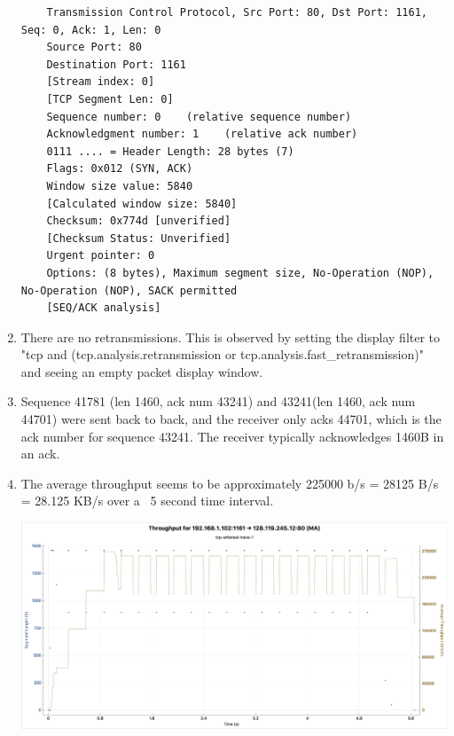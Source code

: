 \documentclass[letter,10pt]{article}
\begin{document}
\begin{enumerate}
	\begin{verbatim}
	Transmission Control Protocol, Src Port: 80, Dst Port: 1161, Seq: 0, Ack: 1, Len: 0
	Source Port: 80
	Destination Port: 1161
	[Stream index: 0]
	[TCP Segment Len: 0]
	Sequence number: 0    (relative sequence number)
	Acknowledgment number: 1    (relative ack number)
	0111 .... = Header Length: 28 bytes (7)
	Flags: 0x012 (SYN, ACK)
	Window size value: 5840
	[Calculated window size: 5840]
	Checksum: 0x774d [unverified]
	[Checksum Status: Unverified]
	Urgent pointer: 0
	Options: (8 bytes), Maximum segment size, No-Operation (NOP), No-Operation (NOP), SACK permitted
	[SEQ/ACK analysis]
	\end{verbatim}
	
	\item There are no retransmissions. This is observed by setting the display filter to "tcp and (tcp.analysis.retransmission or tcp.analysis.fast\_retransmission)" and seeing an empty packet display window.
	
	\item Sequence 41781 (len 1460, ack num 43241) and 43241(len 1460, ack num 44701) were sent back to back, and the receiver only acks 44701, which is the ack number for sequence 43241. The receiver typically acknowledges 1460B in an ack.
	\pagebreak
	
	\item The average throughput seems to be approximately 225000 b/s = 28125 B/s = 28.125 KB/s over a  ~5 second time interval.
		\begin{center}
			\noindent\includegraphics[height=.5\textheight,width=.9\textwidth]{./figures/hw9p12}
		\end{center}
	\pagebreak
	

\end{enumerate}
\end{document}
